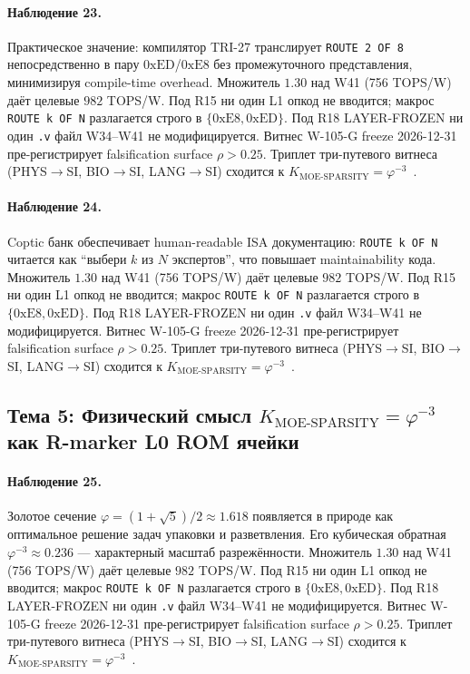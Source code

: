 \paragraph{Наблюдение 23.} Практическое значение: компилятор TRI-27 транслирует \texttt{ROUTE 2 OF 8} непосредственно в пару $0\mathrm{xED}$/$0\mathrm{xE8}$ без промежуточного представления, минимизируя compile-time overhead. Множитель $1{.}30$ над W41 (756 TOPS/W) даёт целевые $982$ TOPS/W. Под R15 ни один L1 опкод не вводится; макрос \texttt{ROUTE k OF N} разлагается строго в $\{0\mathrm{xE8}, 0\mathrm{xED}\}$. Под R18 LAYER-FROZEN ни один \texttt{.v} файл W34--W41 не модифицируется. Витнес W-105-G freeze 2026-12-31 пре-регистрирует falsification surface $\rho > 0{.}25$. Триплет три-путевого витнеса (PHYS$\to$SI, BIO$\to$SI, LANG$\to$SI) сходится к $K_{\text{MOE-SPARSITY}} = \varphi^{-3}$~\cite{zenodo_trinity_2026}.

\paragraph{Наблюдение 24.} Coptic банк обеспечивает human-readable ISA документацию: \texttt{ROUTE k OF N} читается как ``выбери $k$ из $N$ экспертов'', что повышает maintainability кода. Множитель $1{.}30$ над W41 (756 TOPS/W) даёт целевые $982$ TOPS/W. Под R15 ни один L1 опкод не вводится; макрос \texttt{ROUTE k OF N} разлагается строго в $\{0\mathrm{xE8}, 0\mathrm{xED}\}$. Под R18 LAYER-FROZEN ни один \texttt{.v} файл W34--W41 не модифицируется. Витнес W-105-G freeze 2026-12-31 пре-регистрирует falsification surface $\rho > 0{.}25$. Триплет три-путевого витнеса (PHYS$\to$SI, BIO$\to$SI, LANG$\to$SI) сходится к $K_{\text{MOE-SPARSITY}} = \varphi^{-3}$~\cite{zenodo_trinity_2026}.

\subsection{Тема 5: Физический смысл $K_{\text{MOE-SPARSITY}} = \varphi^{-3}$ как R-marker L0 ROM ячейки}

\paragraph{Наблюдение 25.} Золотое сечение $\varphi = (1+\sqrt{5})/2 \approx 1{.}618$ появляется в природе как оптимальное решение задач упаковки и разветвления. Его кубическая обратная $\varphi^{-3} \approx 0{.}236$ --- характерный масштаб разрежённости. Множитель $1{.}30$ над W41 (756 TOPS/W) даёт целевые $982$ TOPS/W. Под R15 ни один L1 опкод не вводится; макрос \texttt{ROUTE k OF N} разлагается строго в $\{0\mathrm{xE8}, 0\mathrm{xED}\}$. Под R18 LAYER-FROZEN ни один \texttt{.v} файл W34--W41 не модифицируется. Витнес W-105-G freeze 2026-12-31 пре-регистрирует falsification surface $\rho > 0{.}25$. Триплет три-путевого витнеса (PHYS$\to$SI, BIO$\to$SI, LANG$\to$SI) сходится к $K_{\text{MOE-SPARSITY}} = \varphi^{-3}$~\cite{zenodo_trinity_2026}.

